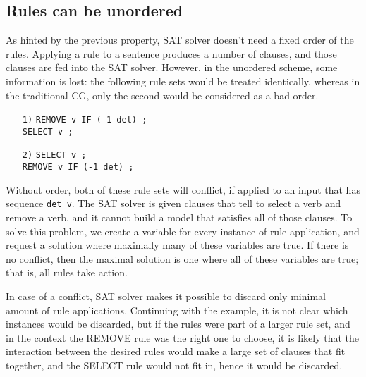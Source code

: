 \documentclass[11pt]{article}
\newcommand{\todo}[1]{{\color{cyan}\textbf{[TODO: }#1\textbf{]}}}
\begin{document}



\subsection{Rules can be unordered}

As hinted by the previous property, SAT solver doesn't need a fixed
order of the rules.
Applying a rule to a sentence produces a number of clauses,
and those clauses are fed into the SAT solver.
However, in the unordered scheme, some information is lost: the
following rule sets would be treated identically, whereas in the
traditional CG, only the second would be considered as a bad order.

\begin{itemize}
\item [\texttt{1)}] \texttt{REMOVE v IF (-1 det) ;} \\
         \texttt{SELECT v ;}
\item [\texttt{2)}] \texttt{SELECT v ;} \\
         \texttt{REMOVE v IF (-1 det) ;} 
\end{itemize}

Without order, both of these rule sets will conflict, if applied to an
input that has sequence \texttt{det v}.
The SAT solver is given clauses that tell to select a verb and remove a
verb, and it cannot build a model that satisfies all of those clauses.
To solve this problem, we create a variable for every instance of rule application, and request a solution where maximally many of these variables are true.
If there is no conflict, then the maximal solution is one where all of
these variables are true; that is, all rules take action.


In case of a conflict, SAT solver makes it possible to discard only
minimal amount of rule applications. Continuing with the example,
it is not clear which instances would be discarded, but if the rules
were part of a larger rule set, and in the context the REMOVE rule was
the right one to choose, it is likely that the interaction between the desired
rules would make a large set of clauses that fit together, and the
SELECT rule would not fit in, hence it would be discarded. 
\end{document}
